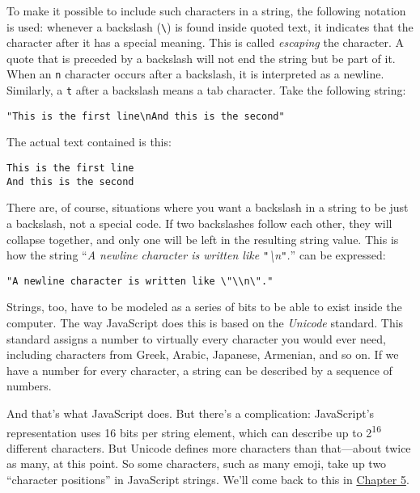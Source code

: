 To make it possible to include such characters in a string, the following notation is used: whenever a backslash (\lstinline`\`) is found inside quoted text, it indicates that the character after it has a special meaning. This is called \emph{escaping} the character. A quote that is preceded by a backslash will not end the string but be part of it. When an \lstinline`n` character occurs after a backslash, it is interpreted as a newline. Similarly, a \lstinline`t` after a backslash means a tab character. Take the following string:

\begin{lstlisting}
"This is the first line\nAnd this is the second"
\end{lstlisting}
\noindent

The actual text contained is this:

\begin{lstlisting}
This is the first line
And this is the second
\end{lstlisting}
\noindent

There are, of course, situations where you want a backslash in a string to be just a backslash, not a special code. If two backslashes follow each other, they will collapse together, and only one will be left in the resulting string value. This is how the string ``\emph{A newline character is written like \lstinline`"`\textbackslash n\lstinline`"`.}'' can be expressed:

\begin{lstlisting}
"A newline character is written like \"\\n\"."
\end{lstlisting}
\noindent{}

\label{values.unicode}Strings, too, have to be modeled as a series of bits to be able to exist inside the computer. The way JavaScript does this is based on the \emph{Unicode} standard. This standard assigns a number to virtually every character you would ever need, including characters from Greek, Arabic, Japanese, Armenian, and so on. If we have a number for every character, a string can be described by a sequence of numbers.

And that's what JavaScript does. But there's a complication: JavaScript's representation uses 16 bits per string element, which can describe up to 2\textsuperscript{16} different characters. But Unicode defines more characters than that—about twice as many, at this point. So some characters, such as many emoji, take up two ``character positions'' in JavaScript strings. We'll come back to this in \hyperref[higher_order.code_units]{Chapter 5}.

